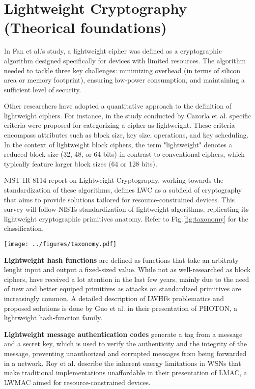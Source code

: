 \documentclass[conference,compsoc]{IEEEtran}
\begin{document}
\section{Lightweight Cryptography (Theorical foundations)}
In Fan et al.'s study\cite{fan2013wg}, a lightweight cipher was defined as a cryptographic algorithm designed specifically for devices with limited resources. The algorithm needed to tackle three key challenges: minimizing overhead (in terms of silicon area or memory footprint), ensuring low-power consumption, and maintaining a sufficient level of security.

Other researchers have adopted a quantitative approach to the definition of lightweight ciphers. For instance, in the study conducted by Cazorla et al.\cite{cazorla2013survey} specific criteria were proposed for categorizing a cipher as lightweight. These criteria encompass attributes such as block size, key size, operations, and key scheduling. In the context of lightweight block ciphers, the term "lightweight" denotes a reduced block size (32, 48, or 64 bits) in contrast to conventional ciphers, which typically feature larger block sizes (64 or 128 bits).

NIST IR 8114 report on Lightweight Cryptography\cite{NIST}, working towards the standardization of
these algorithms, defines LWC as a subfield of cryptography that aims to provide solutions tailored for resource-constrained devices. This survey will follow NISTs standardization of lightweight algorithms, replicating its lightweight cryptographic primitives anatomy. Refer to Fig.\ref{fig:taxonomy} for the classification. 

\begin{figure*}
    \centering
    \texttt{[image: ../figures/taxonomy.pdf]}
    \caption{Structure-wise classification of LWC.}
    \label{fig:taxonomy}
\end{figure*}

\textbf{Lightweight hash functions} are defined as functions that take an arbitraty lenght input and output a fixed-sized value. While not as well-researched as block ciphers, have received a lot atention in the last few years, mainly due to the need of new and better equiped primitives as attacks on standardized primitives are increasingly common. A detailed description of LWHFs problematics and proposed solutions is done by Guo et al. in their presentation of PHOTON, a lightweight hash-function family\cite{guo2011photon}.

\textbf{Lightweight message authentication codes} generate a tag from a message and a secret key, which is used to verify the authenticity and the integrity of the message, preventing unauthorized and corrupted messages from being forwarded in a network. Roy et al. describe the inherent energy limitations in WSNs that make traditional implementations unaffordable in their presentation of LMAC, a LWMAC aimed for resource-constrained devices\cite{chowdhury2015lmac}.
\end{document}
